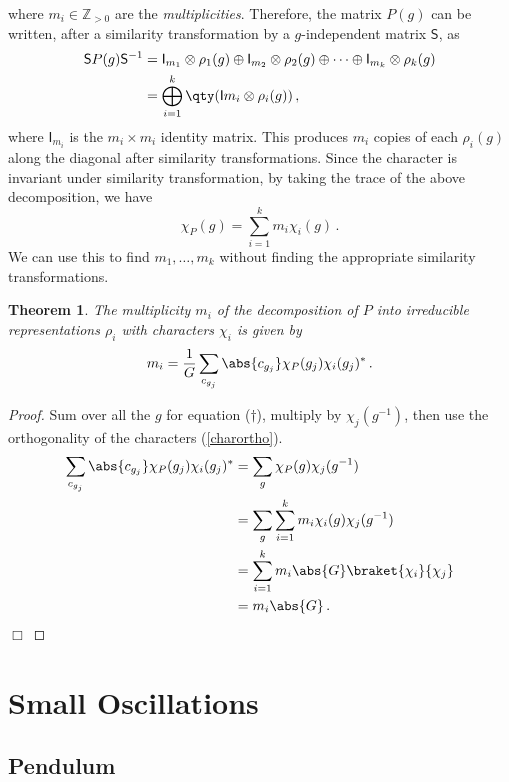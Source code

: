 \documentclass{article}
\theoremstyle{plain}\theoremheaderfont{\normalfont\itshape}\theorembodyfont{\rmfamily}\theoremseparator{.}\newtheorem*{rem}{Remark}\newtheorem*{ex}{Example}\newtheorem*{proof}{Proof}\newtheorem*{altp}{Alternative proof}
\theoremstyle{plain}\theoremheaderfont{\normalfont\bfseries}\theorembodyfont{\rmfamily}\theoremseparator{.}\newtheorem{thm}{Theorem}[section]\newtheorem{lem}[thm]{Lemma}\newtheorem{prop}[thm]{Proposition}\newtheorem*{cor}{Corollary}\newtheorem{defn}[thm]{Definition}\newtheorem{clm}[thm]{Claim}\newtheorem{clminproof}{Claim}
\theoremstyle{break}\theoremheaderfont{\normalfont\itshape}\theorembodyfont{\rmfamily}\theoremseparator{.\medskip}\newtheorem*{proofskip}{Proof}\newtheorem*{exs}{Examples}\newtheorem*{rems}{Remarks}
\theoremstyle{break}\theoremheaderfont{\normalfont\bfseries}\theorembodyfont{\rmfamily}\theoremseparator{.\medskip}\newtheorem{lemskip}[thm]{Lemma}\newtheorem{defnskip}[thm]{Definition}\newtheorem{propskip}[thm]{Proposition}\newtheorem{thmskip}[thm]{Theorem}
\numberwithin{equation}{section}
\newcommand{\qed}{\hfill\ensuremath{\Box}}
\begin{document}
	where \(m_i\in \mathbb{Z}_{>0}\) are the \textit{multiplicities}. Therefore, the matrix \(P(g)\) can be written, after a similarity transformation by a \(g\)-independent matrix \(\mathsf{S}\), as
	\begin{align*}
		\mathsf{S}P(g)\mathsf{S}^{-1}&=\mathsf{I}_{m_1}\otimes\rho_1(g)\oplus\mathsf{I}_{m_2}\otimes\rho_2(g)\oplus\dots\oplus\mathsf{I}_{m_k}\otimes\rho_k(g)\\
		&=\bigoplus_{i=1}^{k}\qty(\mathsf{I}{m_i}\otimes\rho_i(g))\,,
	\end{align*}
	where \(\mathsf{I}_{m_i}\) is the \(m_i\times m_i\) identity matrix. This produces \(m_i\) copies of each \(\rho_i(g)\) along the diagonal after similarity transformations. Since the character is invariant under similarity transformation, by taking the trace of the above decomposition, we have
	\begin{equation}\tag{\(\dagger\)}
		\chi_P(g)=\sum_{i=1}^{k}m_i\chi_i(g)\,.
	\end{equation}
	We can use this to find \(m_1,\dots,m_k\) without finding the appropriate similarity transformations.

	\begin{thm}
		The multiplicity \(m_i\) of the decomposition of \(P\) into irreducible representations \(\rho_i\) with characters \(\chi_i\) is given by
		\[m_i=\frac{1}{G}\sum_{c_{g_j}}\abs{c_{g_j}}\chi_P(g_j)\chi_i(g_j)^*\,.\] 
	\end{thm}
	\begin{proof}
		Sum over all the \(g\) for equation (\(\dagger\)), multiply by \(\chi_j(g^{-1})\), then use the orthogonality of the characters (\cref{charortho}).
		\begin{align*}
			\sum_{c_{g_j}}\abs{c_{g_j}}\chi_P(g_j)\chi_i(g_j)^*&=\sum_{g}\chi_P(g)\chi_j(g^{-1})\\
			&=\sum_g\sum_{i=1}^{k}m_i\chi_i(g)\chi_j(g^{-1})\\
			&=\sum_{i=1}^{k}m_i\abs{G}\braket{\chi_i}{\chi_j}\\
			&=m_i\abs{G}\,.
		\end{align*}\qed
	\end{proof}

	\newpage
	
	\section{Small Oscillations}
	\subsection{Pendulum}
\end{document}
